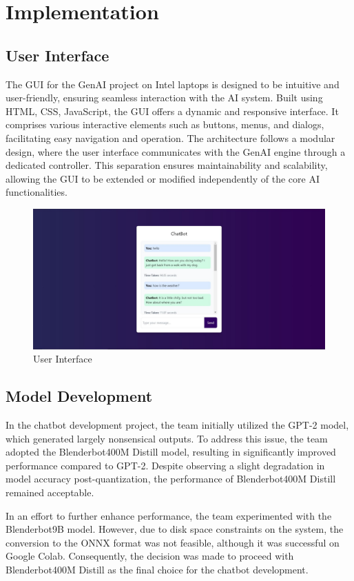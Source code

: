 \documentclass{josis}
\begin{document}
\section{Implementation}

\subsection{User Interface}
The GUI for the GenAI project on Intel laptops is designed to be intuitive and user-friendly, ensuring seamless interaction with the AI system. Built using HTML, CSS, JavaScript, the GUI offers a dynamic and responsive interface. It comprises various interactive elements such as buttons, menus, and dialogs, facilitating easy navigation and operation. The architecture follows a modular design, where the user interface communicates with the GenAI engine through a dedicated controller. This separation ensures maintainability and scalability, allowing the GUI to be extended or modified independently of the core AI functionalities.
\begin{figure}[h]
    \centering
    \includegraphics[width=\textwidth]{gui.jpg}
    \caption{User Interface}
    \label{fig:chatbot_implementation}
\end{figure}
\subsection{Model Development}
In the chatbot development project, the team initially utilized the GPT-2 model, which generated largely nonsensical outputs. To address this issue, the team adopted the Blenderbot400M Distill model, resulting in significantly improved performance compared to GPT-2. Despite observing a slight degradation in model accuracy post-quantization, the performance of Blenderbot400M Distill remained acceptable.

In an effort to further enhance performance, the team experimented with the Blenderbot9B model. However, due to disk space constraints on the system, the conversion to the ONNX format was not feasible, although it was successful on Google Colab. Consequently, the decision was made to proceed with Blenderbot400M Distill as the final choice for the chatbot development. 
\end{document}
